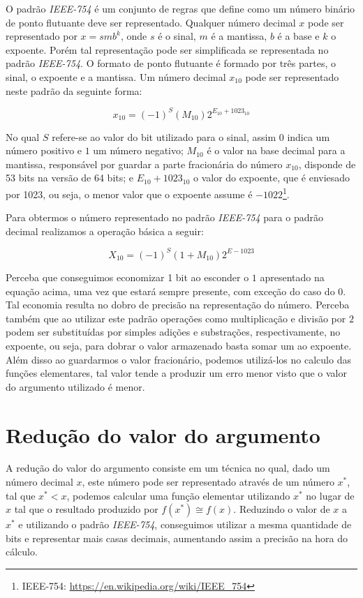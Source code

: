 \documentclass[12pt]{article}
\begin{document}
O padrão \textit{IEEE-754} é um conjunto de regras que define como um número binário de ponto flutuante deve ser representado. Qualquer número decimal $x$ pode ser representado por $x=smb^k$, onde $s$ é o sinal, $m$ é a mantissa, $b$ é a base e $k$ o expoente. Porém tal representação pode ser simplificada se representada no padrão \textit{IEEE-754}. O formato de ponto flutuante é formado por três partes, o sinal, o expoente e a mantissa. Um número decimal $x_{10}$ pode ser representado neste padrão da seguinte forma:

$$x_{10} = (-1)^S(M_{10})2^{E_{10} + 1023_{10}}$$

No qual $S$ refere-se ao valor do bit utilizado para o sinal, assim $0$ indica um número positivo e $1$ um número negativo; $M_{10}$ é o valor na base decimal para a mantissa, responsável por guardar a parte fracionária do número $x_{10}$, disponde de 53 bits na versão de 64 bits; e $E_{10} + 1023_{10}$ o valor do expoente, que é enviesado por 1023, ou seja, o menor valor que o expoente assume é $-1022$\footnote{IEEE-754: \url{https://en.wikipedia.org/wiki/IEEE_754}}.

Para obtermos o número representado no padrão \textit{IEEE-754} para o padrão decimal realizamos a operação básica a seguir:

$$X_{10} = (-1)^{S}(1 + M_{10})2^{E-1023}$$

Perceba que conseguimos economizar 1 bit ao esconder o $1$ apresentado na equação acima, uma vez que estará sempre presente, com exceção do caso do $0$. Tal economia resulta no dobro de precisão na representação do número. Perceba também que ao utilizar este padrão operações como multiplicação e divisão por $2$ podem ser substituídas por simples adições e substrações, respectivamente, no expoente, ou seja, para dobrar o valor armazenado basta somar um ao expoente. Além disso ao guardarmos o valor fracionário, podemos utilizá-los no calculo das funções elementares, tal valor tende a produzir um erro menor visto que o valor do argumento utilizado é menor.

\section{Redução do valor do argumento}

A redução do valor do argumento consiste em um técnica no qual, dado um número decimal $x$, este número pode ser representado através de um número $x^*$, tal que $x^*<x$, podemos calcular uma função elementar utilizando $x^*$ no lugar de $x$ tal que o resultado produzido por $f(x^*) \cong f(x)$. Reduzindo o valor de $x$ a $x^*$ e utilizando o padrão \textit{IEEE-754}, conseguimos utilizar a mesma quantidade de bits e representar mais casas decimais, aumentando assim a precisão na hora do cálculo.
\end{document}
